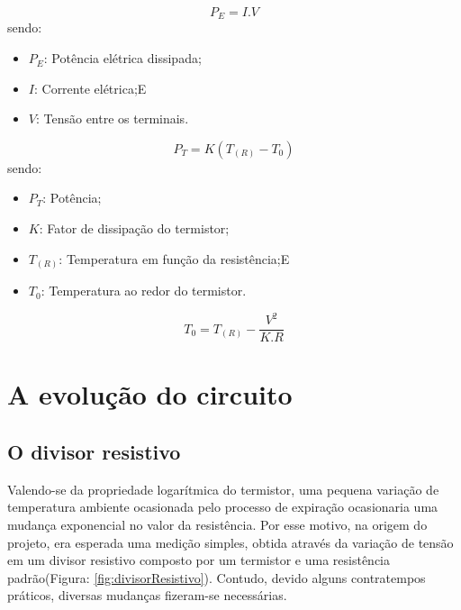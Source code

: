 		\begin{equation}\label{eq:potenciaeletrica}
			P_E = I.V
		\end{equation}
		sendo:
		\begin{itemize}
			\item $P_E$: Potência elétrica dissipada;
			\item $I$: Corrente elétrica;E
			\item $V$: Tensão entre os terminais.
		\end{itemize}

		\begin{equation}\label{eq:potenciatermica}
			P_T = K(T_{(R)} - T_0)
		\end{equation}
		sendo:
		\begin{itemize}
			\item $P_T$: Potência;
			\item $K$: Fator de dissipação do termistor;
			\item $T_{(R)}$: Temperatura em função da resistência;E
			\item $T_0$: Temperatura ao redor do termistor.
		\end{itemize}
		
		\begin{equation} \label{eq:temperaturacomautoaquecimento}
			T_0 = T_{(R)} - \dfrac{V^2}{K.R}
		\end{equation}
		

\section{A evolução do circuito}

\subsection{O divisor resistivo}
 
Valendo-se da propriedade logarítmica do termistor, uma pequena variação de temperatura ambiente ocasionada pelo processo de expiração ocasionaria uma mudança exponencial no valor da resistência. Por esse motivo, na origem do projeto, era esperada uma medição simples, obtida através da variação de tensão em um divisor resistivo composto por um termistor e uma resistência padrão(Figura: \ref{fig:divisorResistivo}). Contudo, devido alguns contratempos práticos, diversas mudanças fizeram-se necessárias. 
 
